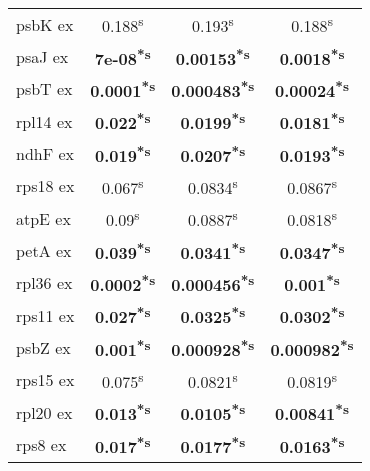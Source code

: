 \documentclass[a4paper]{article}
\begin{document}
\begin{longtable}{l|c|c|c}
psbK ex&0.188\textsuperscript{s}&0.193\textsuperscript{s}&0.188\textsuperscript{s}\\
psaJ ex&\textbf{7e-08\textsuperscript{*}\textsuperscript{s}}&\textbf{0.00153\textsuperscript{*}\textsuperscript{s}}&\textbf{0.0018\textsuperscript{*}\textsuperscript{s}}\\
psbT ex&\textbf{0.0001\textsuperscript{*}\textsuperscript{s}}&\textbf{0.000483\textsuperscript{*}\textsuperscript{s}}&\textbf{0.00024\textsuperscript{*}\textsuperscript{s}}\\
rpl14 ex&\textbf{0.022\textsuperscript{*}\textsuperscript{s}}&\textbf{0.0199\textsuperscript{*}\textsuperscript{s}}&\textbf{0.0181\textsuperscript{*}\textsuperscript{s}}\\
ndhF ex&\textbf{0.019\textsuperscript{*}\textsuperscript{s}}&\textbf{0.0207\textsuperscript{*}\textsuperscript{s}}&\textbf{0.0193\textsuperscript{*}\textsuperscript{s}}\\
rps18 ex&0.067\textsuperscript{s}&0.0834\textsuperscript{s}&0.0867\textsuperscript{s}\\
atpE ex&0.09\textsuperscript{s}&0.0887\textsuperscript{s}&0.0818\textsuperscript{s}\\
petA ex&\textbf{0.039\textsuperscript{*}\textsuperscript{s}}&\textbf{0.0341\textsuperscript{*}\textsuperscript{s}}&\textbf{0.0347\textsuperscript{*}\textsuperscript{s}}\\
rpl36 ex&\textbf{0.0002\textsuperscript{*}\textsuperscript{s}}&\textbf{0.000456\textsuperscript{*}\textsuperscript{s}}&\textbf{0.001\textsuperscript{*}\textsuperscript{s}}\\
rps11 ex&\textbf{0.027\textsuperscript{*}\textsuperscript{s}}&\textbf{0.0325\textsuperscript{*}\textsuperscript{s}}&\textbf{0.0302\textsuperscript{*}\textsuperscript{s}}\\
psbZ ex&\textbf{0.001\textsuperscript{*}\textsuperscript{s}}&\textbf{0.000928\textsuperscript{*}\textsuperscript{s}}&\textbf{0.000982\textsuperscript{*}\textsuperscript{s}}\\
rps15 ex&0.075\textsuperscript{s}&0.0821\textsuperscript{s}&0.0819\textsuperscript{s}\\
rpl20 ex&\textbf{0.013\textsuperscript{*}\textsuperscript{s}}&\textbf{0.0105\textsuperscript{*}\textsuperscript{s}}&\textbf{0.00841\textsuperscript{*}\textsuperscript{s}}\\
rps8 ex&\textbf{0.017\textsuperscript{*}\textsuperscript{s}}&\textbf{0.0177\textsuperscript{*}\textsuperscript{s}}&\textbf{0.0163\textsuperscript{*}\textsuperscript{s}}\\

\end{longtable}
\end{document}
